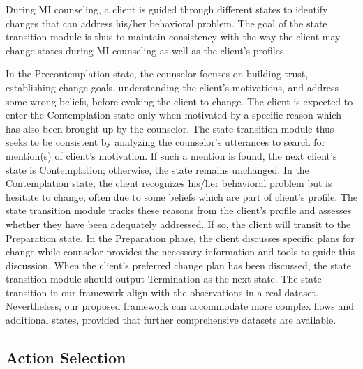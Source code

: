 During MI counseling, a client is guided through different states to identify changes that can address his/her behavioral problem. The goal of the state transition module is thus to maintain consistency with the way the client may change states during MI counseling as well as the client's profiles~\citep{abuse2019enhancing}.

In the Precontemplation state, the counselor focuses on building trust, establishing change goals, understanding the client's motivations, and address some wrong beliefs, before evoking the client to change. The client is expected to enter the Contemplation state only when motivated by a specific reason which has also been brought up by the counselor. The state transition module thus seeks to be consistent by analyzing the counselor's utterances to search for mention(s) of client's motivation. If such a mention is found, the next client's state is Contemplation; otherwise, the state remains unchanged. In the Contemplation state, the client recognizes his/her behavioral problem but is hesitate to change, often due to some beliefs which are part of client's profile. The state transition module tracks these reasons from the client's profile and assesses whether they have been adequately addressed. If so, the client will transit to the Preparation state. In the Preparation phase, the client discusses specific plans for change while counselor provides the necessary information and tools to guide this discussion. When the client's preferred change plan has been discussed, the state transition module should output Termination as the next state. The state transition in our framework align with the observations in a real dataset. Nevertheless, our proposed framework can accommodate more complex flows and additional states, provided that further comprehensive datasets are available.

\subsection{Action Selection}
\label{sec:action selection}

